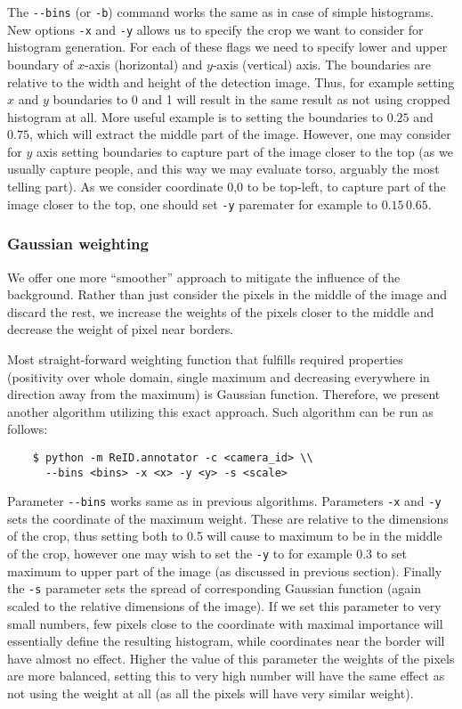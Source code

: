The \verb+--bins+ (or \verb+-b+) command works the same as in case of simple histograms.
New options \verb+-x+ and \verb+-y+ allows us to specify the crop we want to consider
for histogram generation. For each of these flags we need to specify lower and upper
boundary of $x$-axis (horizontal) and $y$-axis (vertical) axis. The boundaries are
relative to the width and height of the detection image. Thus, for example setting $x$ 
and $y$ boundaries to 0 and 1 will result in the same result as not using cropped
histogram at all. More useful example is to setting the boundaries to $0.25$ and $0.75$,
which will extract the middle part of the image. However, one may consider for $y$ axis
setting boundaries to capture part of the image closer to the top (as we usually
capture people, and this way we may evaluate torso, arguably the most telling part).
As we consider coordinate 0,0 to be top-left, to capture part of the image closer
to the top, one should set \verb+-y+ paremater for example to $0.15\,0.65$.

\subsubsection{Gaussian weighting}

We offer one more ``smoother'' approach to mitigate the influence of the background.
Rather than just consider the pixels in the middle of the image and discard the rest,
we increase the weights of the pixels closer to the middle and decrease the weight
of pixel near borders.

Most straight-forward weighting function that fulfills required properties (positivity
over whole domain, single maximum and decreasing everywhere in direction away from the
maximum) is Gaussian function. Therefore, we present another algorithm utilizing this
exact approach. Such algorithm can be run as follows:

\begin{verbatim}
    $ python -m ReID.annotator -c <camera_id> \\
      --bins <bins> -x <x> -y <y> -s <scale>
\end{verbatim}

Parameter \verb+--bins+ works same as in previous algorithms. Parameters \verb+-x+ and
\verb+-y+ sets the coordinate of the maximum weight. These are relative to the dimensions
of the crop, thus setting both to 0.5 will cause to maximum to be in the middle of the
crop, however one may wish to set the \verb+-y+ to for example 0.3 to set maximum to
upper part of the image (as discussed in previous section). Finally the \verb+-s+
parameter sets the spread of corresponding Gaussian function (again scaled to the 
relative dimensions of the image). If we set this parameter
to very small numbers, few pixels close to the coordinate with maximal importance will
essentially define the resulting histogram, while coordinates near the border will
have almost no effect. Higher the value of this parameter the weights of the pixels are
more balanced, setting this to very high number will have the same effect as not using
the weight at all (as all the pixels will have very similar weight).

